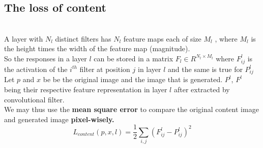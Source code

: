 \documentclass[11pt, a4paper]{article} %
\begin{document}
\subsection{The loss of content}
\\ A layer with $N_{l}$ distinct filters has $N_{l}$ feature maps each of size $M_{l}$
, where $M_{l}$ is the height times the width of the feature map (magnitude).
\\ So the responses in a layer $l$ can be stored in a matrix $F_{l} \in R^{N_l \times M_l}$ where $F^{l}_{ij}$ is the activation of the $i^{th}$ filter at position $j$ in layer $l$ and the same is true for $P^l_{ij}$ 
\\ Let $p$ and $x$ be be the original image and the image that is generated. $P^{l}$, $F^{l}$ being their respective feature representation in layer $l$ after extracted by convolutional filter.
\\ We may thus use the \textbf{mean square error} to compare the original content image and generated image \textbf{pixel-wisely.}
\\ {\Large $$L_{content}(p, x, l) = \frac{1}{2} \sum_{i, j}(F^{l}_{ij} - P^l_{ij})^2$$}
\end{document}
